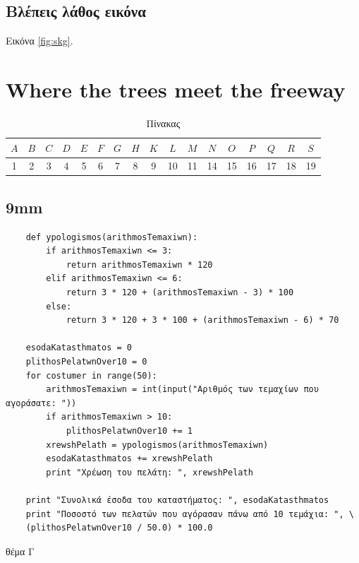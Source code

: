 \documentclass[oneside]{book}
\begin{document}
    \section{Βλέπεις λάθος εικόνα}

    \lipsum[1-3]

    Εικόνα \ref{fig:skg}.

    \chapter{Where the trees meet the freeway}

    \begin{table}[H]
        \begin{tabular}{|c|c|c|c|c|c|c|c|c|c|c|c|c|c|c|c|c|} 
			\hline
			$A$ & $B$ & $C$ & $D$ & $E$ & $F$ & $G$ & $H$ & $K$ & $L$ & $M$ & $N$ & $O$ & $P$ & $Q$ & $R$ & $S$ \\
			\hline
			1 & 2 & 3 & 4 & 5 & 6 & 7 & 8 & 9 & 10 & 11 & 14 & 15 & 16 & 17 & 18 & 19 \\
			\hline
		\end{tabular}
        \caption{Πίνακας}
    \end{table}    

    \lipsum[1-2]

    \section{9mm}

    \lipsum[1-2]

    \begin{listing}[H]
    \begin{verbatim}
    def ypologismos(arithmosTemaxiwn):
        if arithmosTemaxiwn <= 3:
            return arithmosTemaxiwn * 120
        elif arithmosTemaxiwn <= 6:
            return 3 * 120 + (arithmosTemaxiwn - 3) * 100
        else:
            return 3 * 120 + 3 * 100 + (arithmosTemaxiwn - 6) * 70

    esodaKatasthmatos = 0
    plithosPelatwnOver10 = 0
    for costumer in range(50):
        arithmosTemaxiwn = int(input("Αριθμός των τεμαχίων που αγοράσατε: "))
        if arithmosTemaxiwn > 10:
            plithosPelatwnOver10 += 1
        xrewshPelath = ypologismos(arithmosTemaxiwn)
        esodaKatasthmatos += xrewshPelath
        print "Χρέωση του πελάτη: ", xrewshPelath

    print "Συνολικά έσοδα του καταστήματος: ", esodaKatasthmatos
    print "Ποσοστό των πελατών που αγόρασαν πάνω από 10 τεμάχια: ", \ 
    (plithosPelatwnOver10 / 50.0) * 100.0
    \end{verbatim}
    \caption{θέμα Γ}
    \end{listing}
        
\end{document}

